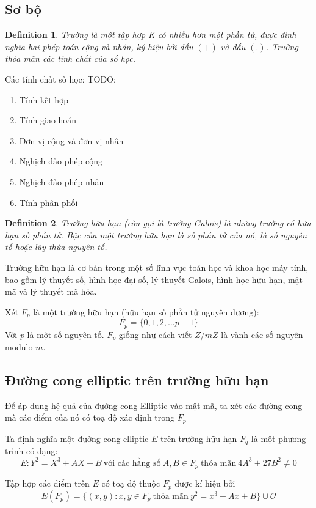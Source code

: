 \documentclass[12pt]{article}
\newtheorem{definition}{Definition}
\begin{document}
\subsection{Sơ bộ}
\begin{definition}
    Trường là một tập hợp K có nhiều hơn một phần tử, được định nghĩa hai phép toán cộng và nhân,
    ký hiệu bởi dấu $(+)$ và dấu $(.)$. Trường thỏa mãn các tính chất của số học.
\end{definition}
Các tính chất số học:
TODO:
\begin{enumerate}
    \item Tính kết hợp
    \item Tính giao hoán
    \item Đơn vị cộng và đơn vị nhân
    \item Nghịch đảo phép cộng
    \item Nghịch đảo phép nhân
    \item Tính phân phối
\end{enumerate}

\begin{definition}
    Trường hữu hạn (còn gọi là trường Galois) là những trường có hữu hạn số phần tử.
    Bậc của một trường hữu hạn là số phần tử của nó, là số nguyên tố hoặc lũy thừa nguyên tố.
\end{definition}
Trường hữu hạn là cơ bản trong một số lĩnh vực toán học và khoa học máy tính,
bao gồm lý thuyết số, hình học đại số, lý thuyết Galois, hình học hữu hạn, mật mã và lý thuyết mã hóa.

Xét $F_p$ là một trường hữu hạn (hữu hạn số phần tử nguyên dương):
$$F_p = \{0, 1, 2, \ldots p-1\}$$
Với $p$ là một số nguyên tố. $F_p$ giống như cách viết $Z/mZ$ là vành các số nguyên modulo $m$.
\subsection{Đường cong elliptic trên trường hữu hạn}
Để áp dụng hệ quả của đường cong Elliptic vào mật mã, ta xét các
đường cong mà các điểm của nó có toạ độ xác định trong $F_p$

Ta định nghĩa một đường cong elliptic $E$ trên trường hữu hạn $F_q$ là một phương trình có dạng:
$$E: Y^2 = X^3 + AX + B\ \text{với các hằng số}\ A, B \in F_p\ \text{thỏa mãn}\ 4A^3 + 27B^2 \neq 0$$


Tập hợp các điểm trên $E$ có toạ độ thuộc $F_p$ được kí hiệu bởi
$$E(F_p) = \{(x, y) : x, y \in F_p\ \text{thỏa mãn}\ y^2 = x^3 + A x + B\} \cup \mathcal{O}$$
\end{document}

